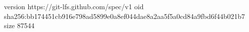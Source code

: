 version https://git-lfs.github.com/spec/v1
oid sha256:bb174451cb916e798ad5899e0a8ef044dae8a2aa5f5a0cd84a9fbd6f44b021b7
size 87544

